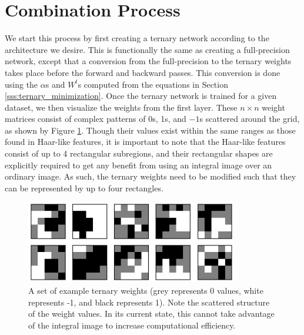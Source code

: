 \documentclass[11pt,a4paper,oldfontcommands]{memoir}
\begin{document}
\section{Combination Process}
We start this process by first creating a ternary network according to the architecture we desire. This is functionally the same as creating a full-precision network, except that a conversion from the full-precision to the ternary weights takes place before the forward and backward passes. This conversion is done using the $\alpha$s and $W^{t}$s computed from the equations in Section \ref{sss:ternary_minimization}. Once the ternary network is trained for a given dataset, we then visualize the weights from the first layer. These $n \times n$ weight matrices consist of complex patterns of 0s, 1s, and $-1$s scattered around the grid, as shown by Figure \ref{fig:ternary_example}. Though their values exist within the same ranges as those found in Haar-like features, it is important to note that the Haar-like features consist of up to 4 rectangular subregions, and their rectangular shapes are explicitly required to get any benefit from using an integral image over an ordinary image. As such, the ternary weights need to be modified such that they can be represented by up to four rectangles.   

\begin{figure}
    \centering
    \includegraphics[width=25em]{Methodology_Images/ternary_example.png}
    \caption{A set of example ternary weights (grey represents 0 values, white represents -1, and black represents 1). Note the scattered structure of the weight values. In its current state, this cannot take advantage of the integral image to increase computational efficiency.}
    \label{fig:ternary_example}
\end{figure}
\end{document}
